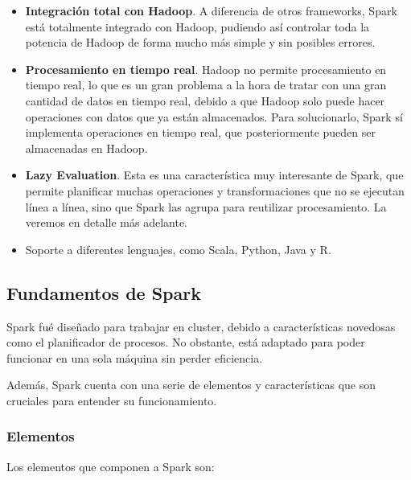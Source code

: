 \begin{itemize}
\item \textbf{Integración total con Hadoop}. A diferencia de otros frameworks, Spark está totalmente integrado con Hadoop, pudiendo así controlar toda la potencia de Hadoop de forma mucho más simple y sin posibles errores. 

\item \textbf{Procesamiento en tiempo real}. Hadoop no permite procesamiento en tiempo real, lo que es un gran problema a la hora de tratar con una gran cantidad de datos en tiempo real, debido a que Hadoop solo puede hacer operaciones con datos que ya están almacenados. Para solucionarlo, Spark sí implementa operaciones en tiempo real, que posteriormente pueden ser almacenadas en Hadoop.

\item \textbf{Lazy Evaluation}. Esta es una característica muy interesante de Spark, que permite planificar muchas operaciones y transformaciones que no se ejecutan línea a línea, sino que Spark las agrupa para reutilizar procesamiento. La veremos en detalle más adelante. 

\item Soporte a diferentes lenguajes, como Scala, Python, Java y R. 
\end{itemize}


\subsection{Fundamentos de Spark}

Spark fué diseñado para trabajar en cluster, debido a características novedosas como el planificador de procesos. No obstante, está adaptado para poder funcionar en una sola máquina sin perder eficiencia.

Además, Spark cuenta con una serie de elementos y características que son cruciales para entender su funcionamiento.

\subsubsection{Elementos}

Los elementos que componen a Spark son:

